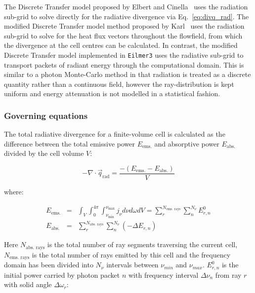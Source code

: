 \par

The Discrete Transfer model proposed by Elbert and Cinella~\cite{elbert_cinnella} uses the radiation sub-grid to solve directly for the radiative divergence via Eq.~\ref{eq:divq_rad}.
The modified Discrete Transfer model method proposed by Karl~\cite{karl2001} uses the radiation sub-grid to solve for the heat flux vectors throughout the flowfield, from which the divergence at the cell centres can be calculated.
In contrast, the modified Discrete Transfer model implemented in \texttt{Eilmer3} uses the radiative sub-grid to transport packets of radiant energy through the computational domain.
This is similar to a photon Monte-Carlo method in that radiation is treated as a discrete quantity rather than a continuous field, however the ray-distribution is kept uniform and energy attenuation is not modelled in a statistical fashion.

\subsubsection{Governing equations}

The total radiative divergence for a finite-volume cell is calculated as the difference between the total emissive power $E_{\text{ems.}}$ and absorptive power $E_{\text{abs.}}$ divided by the cell volume $V$:

\begin{equation}
 - \nabla \cdot \vec{q}_\text{rad} = \frac{ - \left ( E_{\text{ems.}} - E_{\text{abs.}} \right ) }{V}
 \label{eq:my_divq_DT}
\end{equation}

\noindent where:

\begin{eqnarray}
 E_{\text{ems.}} &=& \int_{V} \int_{0}^{{4\pi}} \int_{\nu_{\text{min}}}^{\nu_{\text{max}}} j_{\nu} d\nu d\omega dV = \sum_{r}^{N_{\text{ems. rays}}} \sum_{n}^{N_{\nu}} E_{r,n}^0 \label{eq:E_emission} \\
 E_{\text{abs.}} &=& \sum_{r}^{N_{\text{abs. rays}}} \sum_{n}^{N_{\nu}} \left ( - \Delta E_{r,n} \right ) \label{eq:E_absorption} 
\end{eqnarray}

\noindent Here $N_{\text{abs. rays}}$ is the total number of ray segments traversing the current cell, $N_{\text{ems. rays}}$ is the total number of rays emitted by this cell and the frequency domain has been divided into $N_{\nu}$ intervals between $\nu_{min}$ and $\nu_{max}$. 
$E_{r,n}^0$ is the initial power carried by photon packet $n$ with frequency interval $\Delta \nu_{n}$ from ray $r$ with solid angle $\Delta \omega_{r}$:

